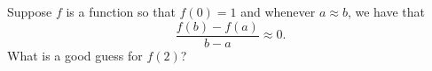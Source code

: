 \documentclass{ximera}
\begin{document}
\begin{problem}
  Suppose $f$ is a function so that $f(0) = 1$ and whenever $a \approx b$, we have that
  \[
  \frac{f(b) - f(a)}{b-a} \approx 0.
  \]
  What is a good guess for $f(2)$?
  \begin{multipleChoice}
  \end{multipleChoice}
\end{problem}
\end{document}
